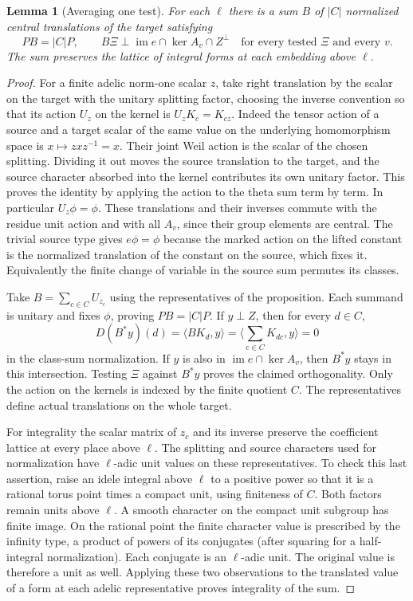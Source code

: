 \documentclass[a4paper,11pt]{article}
\newtheorem{lemma}[proposition]{Lemma}
\theoremstyle{definition}
\theoremstyle{remark}
\numberwithin{equation}{section}
\begin{document}
\begin{lemma}[Averaging one test]\leavevmode
\label{lem:centraltest736}
For each \(\ell\) there is a sum \(B\) of \(|C|\) normalized
central translations of the target satisfying
\[
 PB=|C|P,\qquad
 B\Xi\perp \operatorname{im}e\cap\ker A_v\cap Z^\perp
                  \quad\text{for every tested }\Xi\text{ and every }v .
\]
The sum preserves the lattice of integral forms at each embedding
above \(\ell\).
\end{lemma}
\begin{proof}
For a finite adelic norm-one scalar \(z\), take right translation
by the scalar on the target with the unitary splitting factor,
choosing the inverse convention so that its action \(U_z\) on
the kernel is \(U_zK_c=K_{cz}\). Indeed the tensor action of a
source and a target scalar of the same value on the underlying
homomorphism space is \(x\mapsto zxz^{-1}=x\). Their joint Weil
action is the scalar of the chosen splitting. Dividing it out
moves the source translation to the target, and the source
character absorbed into the kernel contributes its own unitary
factor. This proves the identity by applying the action to the
theta sum term by term. In particular \(U_z\phi=\phi\).
These translations and their inverses commute with the residue
unit action and with all \(A_v\), since their group elements are
central. The trivial source type gives \(e\phi=\phi\) because the
marked action on the lifted constant is the normalized translation
of the constant on the source, which fixes it. Equivalently the
finite change of variable in the source sum permutes its classes.

Take \(B=\sum_{c\in C}U_{z_c}\) using the representatives of the
proposition. Each summand is unitary and fixes \(\phi\), proving
\(PB=|C|P\). If \(y\perp Z\), then for every \(d\in C\),
\[
  D(B^*y)(d)=\langle B K_d,y\rangle
             =\Big\langle\sum_{c\in C}K_{d c},y\Big\rangle=0
\]
in the class-sum normalization. If \(y\) is also in
\(\operatorname{im}e\cap\ker A_v\), then \(B^*y\) stays in this
intersection. Testing \(\Xi\) against \(B^*y\) proves the claimed
orthogonality. Only the action on the kernels is indexed by the
finite quotient \(C\). The representatives define actual
translations on the whole target.

For integrality the scalar matrix of \(z_c\) and its inverse
preserve the coefficient lattice at every place above \(\ell\).
The splitting and source characters used for normalization have
\(\ell\)-adic unit values on these representatives. To check
this last assertion, raise an idele integral above \(\ell\) to
a positive power so that it is a rational torus point times
a compact unit, using finiteness of \(C\). Both factors remain
units above \(\ell\). A smooth character on the compact unit
subgroup has finite image. On the rational point the finite
character value is prescribed by the infinity type, a product
of powers of its conjugates (after squaring for a half-integral
normalization). Each conjugate is an \(\ell\)-adic unit. The
original value is therefore a unit as well. Applying these
two observations to the translated value of a form at each
adelic representative proves integrality of the sum.
\end{proof}
\end{document}
